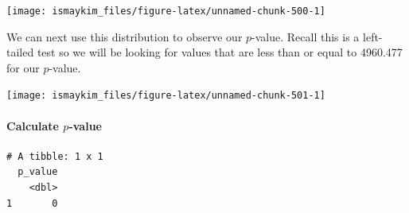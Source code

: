 \documentclass[12pt,]{krantz}
\makeatletter
\newenvironment{Shaded}{\begin{snugshade}}{\end{snugshade}}
\newcommand{\KeywordTok}[1]{\textcolor[rgb]{0.27,0.27,0.27}{\textbf{#1}}}
\newcommand{\DataTypeTok}[1]{\textcolor[rgb]{0.27,0.27,0.27}{#1}}
\newcommand{\StringTok}[1]{\textcolor[rgb]{0.5,0.5,0.5}{#1}}
\newcommand{\OperatorTok}[1]{\textcolor[rgb]{0.43,0.43,0.43}{\textbf{#1}}}
\newcommand{\NormalTok}[1]{#1}
\let\oldparagraph\paragraph
\renewcommand{\paragraph}[1]{\oldparagraph{#1}\mbox{}}
\newenvironment{kframe}{%
\medskip{}
\setlength{\fboxsep}{.8em}
 \def\at@end@of@kframe{}%
 \ifinner\ifhmode%
  \def\at@end@of@kframe{\end{minipage}}%
  \begin{minipage}{\columnwidth}%
 \fi\fi%
 \def\FrameCommand##1{\hskip\@totalleftmargin \hskip-\fboxsep
 \colorbox{shadecolor}{##1}\hskip-\fboxsep
     \hskip-\linewidth \hskip-\@totalleftmargin \hskip\columnwidth}%
 \MakeFramed {\advance\hsize-\width
   \@totalleftmargin\z@ \linewidth\hsize
   \@setminipage}}%
 {\par\unskip\endMakeFramed%
 \at@end@of@kframe}
\renewenvironment{Shaded}{\begin{kframe}}{\end{kframe}}
\theoremstyle{definition}
\theoremstyle{definition}
\theoremstyle{definition}
\theoremstyle{remark}
\makeatother
\begin{document}
\begin{Shaded}
\end{Shaded}

\begin{center}\texttt{[image: ismaykim\_files/figure-latex/unnamed-chunk-500-1]} \end{center}

We can next use this distribution to observe our \(p\)-value. Recall
this is a left-tailed test so we will be looking for values that are
less than or equal to 4960.477 for our \(p\)-value.

\begin{Shaded}
\end{Shaded}

\begin{center}\texttt{[image: ismaykim\_files/figure-latex/unnamed-chunk-501-1]} \end{center}

\paragraph{\texorpdfstring{Calculate
\(p\)-value}{Calculate p-value}}\label{calculate-p-value-4}

\begin{Shaded}
\end{Shaded}

\begin{verbatim}
# A tibble: 1 x 1
  p_value
    <dbl>
1       0
\end{verbatim}
\end{document}
